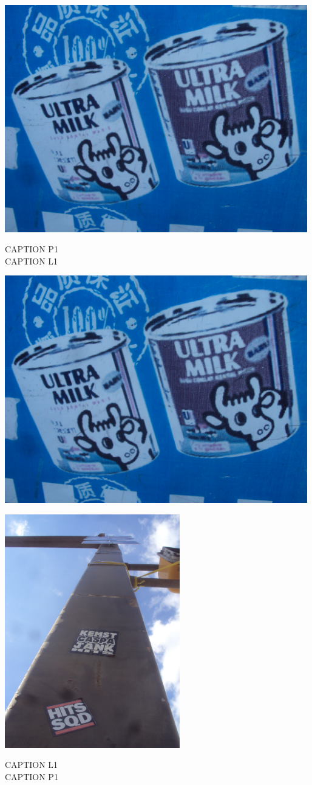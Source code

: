 \documentclass[10pt,letterpaper]{article}
\begin{document}
\vspace{0.25in}
\includegraphics[width=5.19in]{landscape.jpg}

CAPTION P1\\
CAPTION L1\\
\pagebreak

\includegraphics[width=5.19in]{landscape.jpg}

\vspace{0.25in}
\includegraphics[height=4in]{portrait.jpg}

CAPTION L1\\
CAPTION P1\\
\pagebreak
\end{document}
